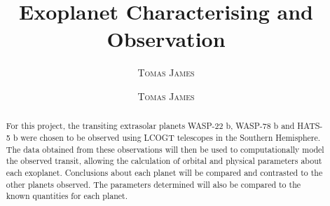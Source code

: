 \documentclass[twoside]{article}
\title{\vspace{-15mm}\fontsize{24pt}{10pt}\selectfont\textbf{Exoplanet Characterising and Observation}} %
\author{\textsc{Tomas James}}
\author{
\large
\textsc{Tomas James} %
\vspace{-5mm}
}
\date{}
\begin{document}
\maketitle %

\thispagestyle{fancy} %


\begin{abstract}
For this project, the transiting extrasolar planets WASP-22 b, WASP-78 b and HATS-5 b were chosen to be observed using LCOGT telescopes in the Southern Hemisphere. The data obtained from these observations will then be used to computationally model the observed transit, allowing the calculation of orbital and physical parameters about each exoplanet. Conclusions about each planet will be compared and contrasted to the other planets observed. The parameters determined will also be compared to the known quantities for each planet.
\end{abstract}

\end{document}
